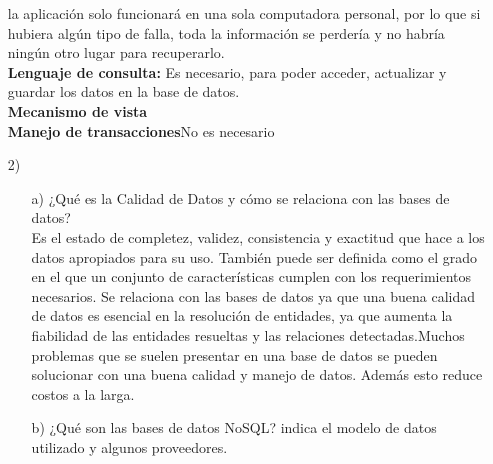\documentclass[a4paper, 12pt]{report}
\begin{document}
\begin{enumerate}
{\begin{enumerate}
{    la aplicación solo funcionará en una sola computadora personal,
    por lo que si hubiera algún tipo de falla, toda la información
    se perdería y no habría ningún otro lugar para recuperarlo.\\
    \textbf{Lenguaje de consulta:} Es necesario, para poder acceder,
    actualizar y guardar los datos en la base de datos.\\
    \textbf{Mecanismo de vista}\\
    \textbf{Manejo de transacciones}No es necesario\\}
\end{enumerate}
}
\item[2)]{
\begin{enumerate}
    \item[a)]{¿Qué es la Calidad de Datos y cómo se relaciona con las
    bases de datos?\\
    Es  el estado de completez, validez, consistencia y exactitud
    que hace a los datos apropiados para su uso. También puede ser
    definida como el grado en el que un conjunto de características
    cumplen con los requerimientos necesarios.
    Se relaciona con las bases de datos ya que una buena calidad de
    datos es esencial en la resolución de entidades, ya que aumenta la
    fiabilidad de las entidades resueltas y las relaciones
    detectadas.Muchos problemas que se suelen presentar en una base
    de datos se pueden solucionar con una buena calidad y manejo
    de datos. Además esto reduce costos a la larga.
}
    \item[b)]{¿Qué son las bases de datos NoSQL? indica el modelo de datos utilizado y algunos proveedores. }\\


\end{enumerate}}
\end{enumerate}
\end{document}
